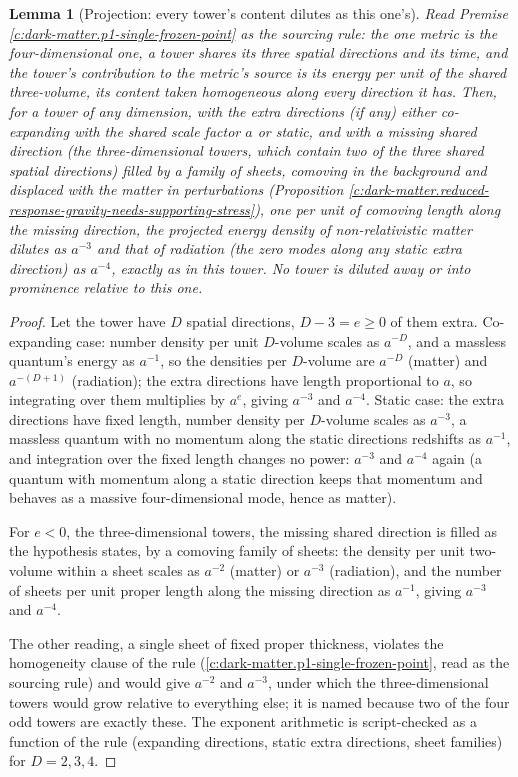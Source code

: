 \documentclass[11pt]{article}
\newtheorem{lemma}[theorem]{Lemma}
\theoremstyle{definition}
\theoremstyle{plain}
\newcommand{\changedmark}[2]{\marginpar{\raggedright\scriptsize\color{#1}#2}}
\begin{document}
\begin{lemma}[Projection: every tower's content dilutes as this one's]\label{c:dark-matter.projection-every-towers-content-dilutes-ones}
\changedmark{gray}{reworded}
Read Premise \ref{c:dark-matter.p1-single-frozen-point} as the sourcing rule: the one metric is the four-dimensional one, a tower shares its three spatial directions and its time, and the tower's contribution to the metric's source is its energy per unit of the shared three-volume, its content taken homogeneous along every direction it has. Then, for a tower of any dimension, with the extra directions (if any) either co-expanding with the shared scale factor $a$ or static, and with a missing shared direction (the three-dimensional towers, which contain two of the three shared spatial directions) filled by a family of sheets, comoving in the background and displaced with the matter in perturbations (Proposition \ref{c:dark-matter.reduced-response-gravity-needs-supporting-stress}), one per unit of comoving length along the missing direction, the projected energy density of non-relativistic matter dilutes as $a^{-3}$ and that of radiation (the zero modes along any static extra direction) as $a^{-4}$, exactly as in this tower. No tower is diluted away or into prominence relative to this one.
\end{lemma}
\begin{proof}
Let the tower have $D$ spatial directions, $D - 3 = e \geq 0$ of them extra. Co-expanding case: number density per unit $D$-volume scales as $a^{-D}$, and a massless quantum's energy as $a^{-1}$, so the densities per $D$-volume are $a^{-D}$ (matter) and $a^{-(D+1)}$ (radiation); the extra directions have length proportional to $a$, so integrating over them multiplies by $a^{e}$, giving $a^{-3}$ and $a^{-4}$. Static case: the extra directions have fixed length, number density per $D$-volume scales as $a^{-3}$, a massless quantum with no momentum along the static directions redshifts as $a^{-1}$, and integration over the fixed length changes no power: $a^{-3}$ and $a^{-4}$ again (a quantum with momentum along a static direction keeps that momentum and behaves as a massive four-dimensional mode, hence as matter).

For $e < 0$, the three-dimensional towers, the missing shared direction is filled as the hypothesis states, by a comoving family of sheets: the density per unit two-volume within a sheet scales as $a^{-2}$ (matter) or $a^{-3}$ (radiation), and the number of sheets per unit proper length along the missing direction as $a^{-1}$, giving $a^{-3}$ and $a^{-4}$.

The other reading, a single sheet of fixed proper thickness, violates the homogeneity clause of the rule (\ref{c:dark-matter.p1-single-frozen-point}, read as the sourcing rule) and would give $a^{-2}$ and $a^{-3}$, under which the three-dimensional towers would grow relative to everything else; it is named because two of the four odd towers are exactly these. The exponent arithmetic is script-checked as a function of the rule (expanding directions, static extra directions, sheet families) for $D = 2, 3, 4$.

\end{proof}
\end{document}
